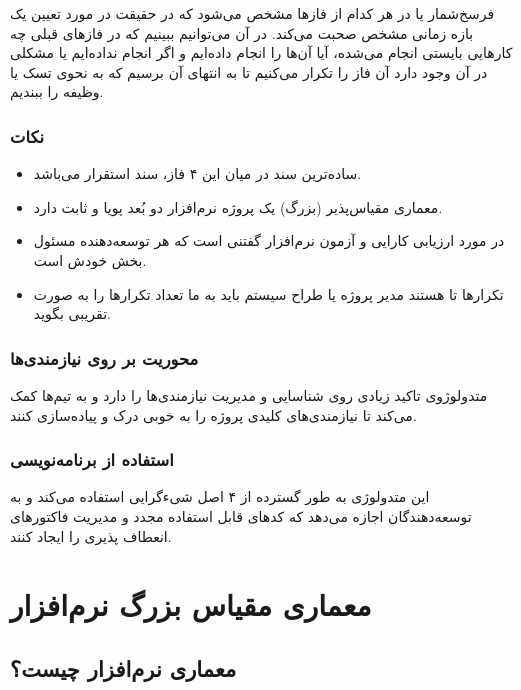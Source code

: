 \documentclass[a4paper]{article}
\begin{document}
فرسخ‌شمار یا  در هر کدام از فاز‌ها مشخص می‌شود که در حقیقت در مورد
تعیین یک بازه زمانی مشخص صحبت می‌کند. در آن می‌توانیم ببینیم که در فاز‌های قبلی
چه کار‌هایی بایستی انجام می‌شده، آیا آن‌ها را انجام داده‌ایم و اگر انجام
نداده‌ایم یا مشکلی در آن وجود دارد آن فاز را تکرار می‌کنیم تا به انتهای آن برسیم
که به نحوی تسک یا وظیفه را ببندیم.

\subsubsection*{نکات}

\begin{itemize}
    \item ساده‌ترین سند در میان این ۴ فاز، سند استقرار می‌باشد.
    \item معماری مقیاس‌پذیر (بزرگ) یک پروژه نرم‌افزار دو بُعد پویا و ثابت دارد.
    \item در مورد ارزیابی کارایی و آزمون نرم‌افزار گفتنی است که هر توسعه‌دهنده
    مسئول  بخش خودش است.
    \item تکرار‌ها  تا هستند مدیر پروژه یا طراح سیستم باید به ما تعداد
    تکرار‌ها را به صورت تقریبی بگوید.
\end{itemize}

\subsubsection{محوریت بر روی نیازمندی‌ها}

متدولوژوی  تاکید زیادی روی شناسایی و مدیریت نیازمندی‌ها را دارد و به
تیم‌ها کمک می‌‌کند تا نیازمندی‌های کلیدی پروژه‌ را به خوبی درک و پیاده‌سازی
کنند.

\subsubsection{استفاده از برنامه‌نویسی }

این متدولوژی به طور گسترده از ۴ اصل شیء‌گرایی استفاده می‌کند و به توسعه‌دهندگان
اجازه می‌دهد که کد‌های قابل استفاده مجدد و مدیریت فاکتور‌های انعطاف پذیری را
ایجاد کنند.

\section{معماری مقیاس بزرگ نرم‌افزار}

\subsection{معماری نرم‌افزار چیست؟}
\end{document}
